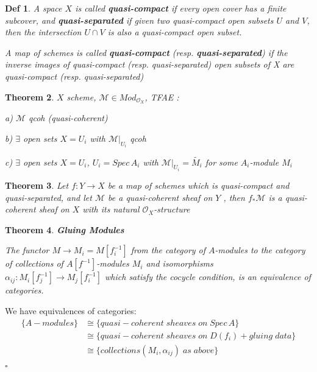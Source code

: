 \documentclass{article}
\newtheorem{theorem}{Theorem}[section]
\newtheorem{definition}[theorem]{Def}
\newenvironment{Proof}{{\noindent \indent \it Proof:\quad}}{\hfill $\square$\par}
\begin{document}
\begin{definition}
    A space $X$ is called \textbf{quasi-compact} if every open cover has a finite subcover, and
\textbf{quasi-separated} if given two quasi-compact open subsets $U$ and $V$, then the intersection $U \cap V$ is also
a quasi-compact open subset.

A map of schemes is called \textbf{quasi-compact} (resp. \textbf{quasi-separated}) if the
inverse images of quasi-compact (resp. quasi-separated) open subsets of X are quasi-compact (resp.
quasi-separated)
\end{definition}
\begin{theorem}
    $X$ scheme, $\mathcal M\in Mod_{\mathcal O_X}$, TFAE :
    
    a) $\mathcal M$ qcoh (quasi-coherent)

    b) $\exists$ open sets $X=U_i$ with $\mathcal M|_{U_i}$ qcoh

    c) $\exists$ open sets $X=U_i$, $U_i=Spec\, A_i$ with $\mathcal M|_{U_i}=\widetilde {M_i}$ for some $A_i$-module $M_i$
\end{theorem}

\begin{theorem}
    Let $f : Y \to X$ be a map of schemes which is quasi-compact and quasi-separated, and let $\mathcal M$ be a quasi-coherent sheaf on $Y$ , then $f_\ast\mathcal M$ is a quasi-coherent sheaf on $X$ with its natural $\mathcal O_X$-structure
\end{theorem}

\begin{theorem}
    \textbf{Gluing Modules}

The functor $M \to M_i = M[f_i^{-1}]$ from the category of $A$-modules to the category of collections of $A[f^{-1}]$-modules $M_i$ and isomorphisms $\alpha_{ij} : M_i
[f_j^{-1}] \to M_j [f_i^{-1}]$ which
satisfy the cocycle condition, is an equivalence of categories.
\end{theorem}
\begin{Proof}
We have equivalences of categories:
\begin{align*}
\label{sup}
\{A-modules\}&\cong
\{quasi-coherent\; sheaves\; on\; Spec\, A\}\\
&\cong \{quasi-coherent\; sheaves\; on\; D(f_i) + gluing\; data\}\\
&\cong \{collections (M_i
, \alpha_{ij} )\; as\; above\}
 \end{align*}
\end{Proof}
 
\end{document}
